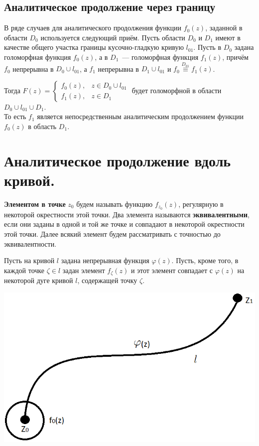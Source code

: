 \documentclass[a4paper, 12pt]{report}
\begin{document}
\subsection{Аналитическое продолжение через границу}
В ряде случаев для аналитического продолжения функции $f_0(z)$, заданной в области $D_0$ используется следующий приём. Пусть области $D_0$ и $D_1$ имеют в качестве общего участка границы кусочно-гладкую кривую $l_{01}$.
Пусть в $D_0$ задана голоморфная функция $f_0(z)$, а в $D_1$~--- голоморфная функция $f_1(z)$, причём $f_0$ непрерывна в $D_0 \cup l_{01}$, а $f_1$ непрерывна в $D_1 \cup l_{01}$ и $f_0 \overset{D_{01}}{\equiv} f_1(z)$.

Тогда $\displaystyle F(z) = 
\begin{cases}
    f_0(z), & z \in D_0 \cup l_{01} \\
    f_1(z), & z \in D_1
\end{cases}$
\quad будет голоморфной в области $D_0 \cup l_{01} \cup D_1$. \\
То есть $f_1$ является непосредственным аналитическим продолжением функции $f_0(z)$ в область $D_1$.


\section{Аналитическое продолжение вдоль кривой.}

\textbf{Элементом в точке} $z_0$ будем называть функцию $f_{z_0}(z)$, регулярную в некоторой окрестности этой точки. Два элемента называются \textbf{эквивалентными}, если они заданы в одной и той же точке и совпадают в некоторой окрестности этой точки. Далее всякий элемент будем рассматривать с точностью до эквивалентности.

\par\bigskip
Пусть на кривой $l$ задана непрерывная функция $\varphi(z)$. Пусть, кроме того, в каждой точке $\zeta \in l$ задан элемент $f_{\zeta}(z)$ и этот элемент совпадает с $\varphi(z)$ на некоторой дуге кривой $l$, содержащей точку $\zeta$.

\begin{center}
    \includegraphics[width=8 cm]{continueCurve/l.png} 
\end{center}
\end{document}
